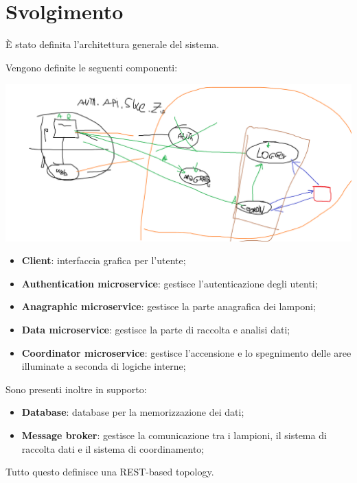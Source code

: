 \section{Svolgimento}

È stato definita l'architettura generale del sistema.

Vengono definite le seguenti componenti:



\includegraphics[width = 0.9\linewidth]{img/architettura.png}

\begin{itemize}
    \item \textbf{Client}: interfaccia grafica per l'utente;
    \item \textbf{Authentication microservice}: gestisce l'autenticazione degli utenti;
    \item \textbf{Anagraphic microservice}: gestisce la parte anagrafica dei lamponi;
    \item \textbf{Data microservice}: gestisce la parte di raccolta e analisi dati;
    \item \textbf{Coordinator microservice}: gestisce l'accensione e lo spegnimento delle aree illuminate a seconda di logiche interne;
\end{itemize}

Sono presenti inoltre in supporto:
\begin{itemize}
    \item \textbf{Database}: database per la memorizzazione dei dati;
    \item \textbf{Message broker}: gestisce la comunicazione tra i lampioni, il sistema di raccolta dati e il sistema di coordinamento;
\end{itemize}

Tutto questo definisce una REST-based topology.